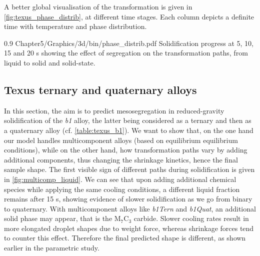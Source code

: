 A better global visualisation of the transformation is given in \cref{fig:texus_phase_distrib}, at different time stages.
Each column depicts a definite time with temperature and phase distribution. 


\begin{figureth}
{0.9}
{Chapter5/Graphics/3d/bin/phase_distrib.pdf}
{Solidification progress at 5, 10, 15 and 20 s showing the effect of segregation on the transformation paths, from liquid to solid and solid-state.}
\label{fig:texus_phase_distrib}
\end{figureth}


\subsection{Texus ternary and quaternary alloys}

In this section, the aim is to predict mesosegregation in reduced-gravity solidification of the \emph{b1} alloy, the latter being considered 
as a ternary and then as a quaternary alloy (cf. \cref{table:texus_b1}). 
We want to show that, on the one hand our model handles multicomponent alloys (based on equilibrium equilibrium conditions), while
on the other hand, how transformation paths vary by adding additional components, thus changing the shrinkage kinetics, hence the final sample shape.
The first visible sign of different paths during solidification is given in \cref{fig:multicomp_liquid}. We can see that upon adding
additional chemical species while applying the same cooling conditions, a different liquid fraction remains after 15 s, showing evidence 
of slower solidification as we go from binary to quaternary. With multicomponent alloys like \emph{b1Tern} and \emph{b1Quat}, an additional solid
phase may appear, that is the M$_7$C$_3$ carbide.
Slower cooling rates result in more elongated droplet shapes due to weight force, whereas shrinkage forces tend to counter this effect.
Therefore the final predicted shape is different, as shown earlier in the parametric study.


